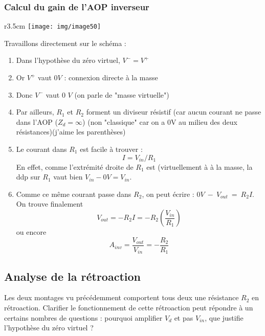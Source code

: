 \subsubsection{Calcul du gain de l'AOP inverseur}
\begin{wrapfigure}[8]{r}{3.5cm}
	\texttt{[image: img/image50]}
\end{wrapfigure}
Travaillons directement sur le schéma :
\begin{enumerate}
	\item Dans l'hypothèse du zéro virtuel, $V^- = V^+$
	\item Or $V^+$ vaut $0V$ : connexion directe à la masse
	\item Donc $V^-$ vaut 0 $V$ (on parle de "masse virtuelle")
	\item Par ailleurs, $R_1$ et $R_2$ forment un diviseur résistif (car aucun courant ne passe dans l'AOP ($Z_d = \infty$) (non "classique" car on a 0V au milieu des deux résistances)(j'aime les parenthèses)
	\item Le courant dans $R_1$ est facile à trouver :
	      \begin{equation}
	      	I = V_{in}/R_1
	      \end{equation}
	      En effet, comme l'extrémité droite de $R_1$ est (virtuellement à à la masse, la ddp sur $R_1$ vaut bien $V_{in}-0V = V_{in}$.
	\item Comme ce même courant passe dans $R_2$, on peut écrire : $0V~-~V_{out}~=~ R_2I$. On trouve finalement
	      \begin{equation}
	      	V_{out} = -R_2I = -R_2\left(\frac{V_{in}}{R_1}\right)
	      \end{equation}
	      ou encore
	      \begin{equation}
	      	A_{inv} = \frac{V_{out}}{V_{in}} = - \frac{R_2}{R_1}
	      \end{equation}
\end{enumerate}


	\subsection{Analyse de la rétroaction}
	Les deux montages vu précédemment comportent tous deux une résistance $R_2$ 
	en rétroaction. Clarifier le fonctionnement de cette rétroaction peut 
	répondre à un certains nombres de questions : pourquoi amplifier $V_d$ et 
	pas $V_{in}$, que justifie l'hypothèse du zéro virtuel ?
	
